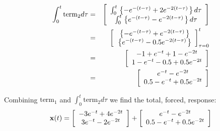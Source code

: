 \begin{eqnarray*}
	\int_0^t {{\rm{term}}_2 d\tau }  & = & \left[ {\begin{array}{*{20}c}
	   {\int_0^t {\left. {\left\{ { - e^{ - (t - \tau )}  + 2e^{ - 2(t - \tau )} } \right.} \right\}d\tau } }  \\
	   {\int_0^t {\left. {\left\{ {e^{ - (t - \tau )}  - e^{ - 2(t - \tau )} } \right.} \right\}d\tau } }  \\
	\end{array}} \right] \\
	& = &
	  \left[ {\begin{array}{*{20}c}
	   {\left. {\left\{ { - e^{ - (t - \tau )}  + e^{ - 2(t - \tau )} } \right.} \right\}}  \\
	   {\left. {\left\{ {e^{ - (t - \tau )}  - 0.5e^{ - 2(t - \tau )} } \right.} \right\}}  \\
	\end{array}} \right]_{\tau  = 0}^t  \\
	 & = & \left[ {\begin{array}{*{20}c}
	   { - 1 + e^{ - t}  + 1 - e^{ - 2t} }  \\
	   { 1 - e^{ - t}  - 0.5 + 0.5e^{ - 2t} }  \\
	\end{array}} \right] \\
	 &  = & \left[ {\begin{array}{*{20}c}
	   {e^{ - t}  - e^{ - 2t} }  \\
	   {0.5 - e^{ - t}  + 0.5e^{ - 2t} }  \\
	\end{array}} \right]
\end{eqnarray*}

Combining $\mathrm{term}_1$ and $\int_0^t \mathrm{term}_2 d\tau$ we find the total, forced, response:
\[
{\bf{x}}(t) = \left[ {\begin{array}{*{20}c}
   { - 3e^{ - t}  + 4e^{ - 2t} }  \\
   {3e^{ - t}  - 2e^{ - 2t} }  \\
\end{array}} \right] + \left[ {\begin{array}{*{20}c}
   {e^{ - t}  - e^{ - 2t} }  \\
   {0.5 - e^{ - t}  + 0.5e^{ - 2t} }  \\
\end{array}} \right]
\]

